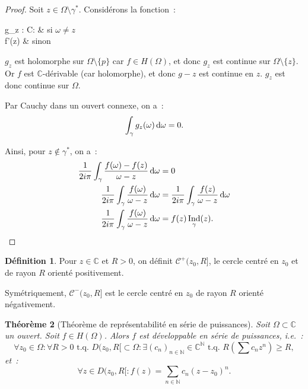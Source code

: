 \documentclass{report}
\newtheorem{thm}{Théorème}[chapter]
\theoremstyle{definition}
\newtheorem{déf}[thm]{Définition}
\theoremstyle{remark}
\numberwithin{equation}{section}
\newcommand{\C}{\mathbb C}
\newcommand{\N}{\mathbb N}
\newcommand{\tq}{\text{ t.q. }}
\DeclareMathOperator{\Ind}{Ind}
\begin{document}
			\begin{proof} Soit $z \in \Omega \setminus \gamma^*$. Considérons la fonction~:
			\begin{subnumcases}
				{g_z : \Omega \to \C : \omega \mapsto}
					 & si $\omega \neq z$ \\
					f'(z) & sinon
			\end{subnumcases}

			$g_z$ est holomorphe sur $\Omega \setminus \{p\}$ car $f \in H(\Omega)$, et donc $g_z$ est continue sur $\Omega \setminus \{z\}$. Or $f$ est $\C$-dérivable
			(car holomorphe), et donc $g-z$ est continue en $z$. $g_z$ est donc continue sur $\Omega$.

			Par Cauchy dans un ouvert connexe, on a~:
			\begin{equation}
				\int_\gamma g_z(\omega)\dif \omega = 0.
			\end{equation}

			Ainsi, pour $z \not \in \gamma^*$, on a~:
			\begin{align}
				\frac 1{2i\pi}\int_\gamma\frac {f(\omega)-f(z)}{\omega - z}\dif \omega &= 0 \\
				\frac 1{2i\pi}\int_\gamma\frac {f(\omega)}{\omega-z}\dif \omega &= \frac 1{2i\pi}\int_\gamma\frac {f(z)}{\omega - z}\dif \omega \\
				\frac 1{2i\pi}\int_\gamma\frac {f(\omega)}{\omega-z}\dif \omega &= f(z)\Ind_\gamma(z).
			\end{align}
			\end{proof}

			\begin{déf} Pour $z \in \C$ et $R > 0$, on définit $\mathcal C^+(z_0, R]$, le cercle centré en $z_0$ et de rayon $R$ orienté positivement.

			Symétriquement, $\mathcal C^-(z_0, R]$ est le cercle centré en $z_0$ de rayon $R$ orienté négativement.
			\end{déf}

			\begin{thm}[Théorème de représentabilité en série de puissances] Soit $\Omega \subset \C$ un ouvert. Soit $f \in H(\Omega)$. Alors \textit{$f$ est
			développable en série de puissances}, i.e.~:
			\begin{equation}
				\forall z_0 \in \Omega : \forall R > 0 \tq D(z_0, R[ \subset \Omega : \exists (c_n)_{n \in \N} \in \C^\N \tq R(\sum c_nz^n) \geq R,
			\end{equation}
			et~:
			\begin{equation}
				\forall z \in D(z_0, R[ : f(z) = \sum_{n \in \N}c_n(z-z_0)^n.
			\end{equation}
			\end{thm}
\end{document}

